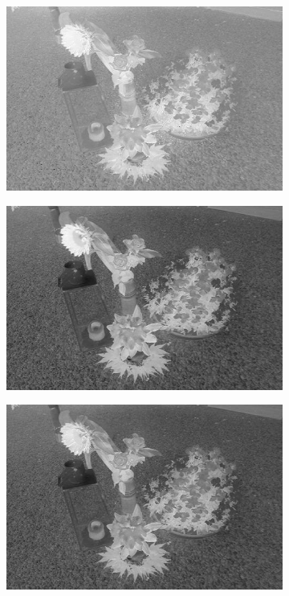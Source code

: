 \begin{figure}[H]
\begin{subfigure}[b]{0.49\textwidth}
        \includegraphics[width=\textwidth]{./figure/appendix/color_rep/images/ndvi.jpg}
		\caption{}
		\label{fig:rgbVSnrgbNDVI}
    \end{subfigure}
    \begin{subfigure}[b]{0.49\textwidth}
        \centering
        \includegraphics[width=\textwidth]{./figure/appendix/color_rep/images/savi.jpg}
		\caption{}
		\label{fig:rgbVSnrgbSAVI}
    \end{subfigure}
    \begin{subfigure}[b]{0.49\textwidth}
        \centering
        \includegraphics[width=\textwidth]{./figure/appendix/color_rep/images/msavi.jpg}

\end{subfigure}
\end{figure}
